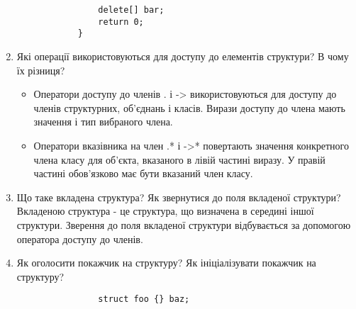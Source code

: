 \begin{enumerate}
\begin{verbatim}
                delete[] bar;
                return 0;
            }
    \end{verbatim}
    \item Які операції використовуються для доступу до елементів структури? В чому їх різниця?
          \begin{itemize}
              \item Оператори доступу до членів . і -> використовуються для доступу до
                    членів структурних, об'єднань і класів. Вирази доступу до
                    члена мають значення і тип вибраного члена.
              \item Оператори вказівника на член .* і ->* повертають значення конкретного
                    члена класу для об'єкта, вказаного в лівій частині виразу.
                    У правій частині обов'язково має бути вказаний член класу.
          \end{itemize}
    \item Що таке вкладена структура? Як звернутися до поля вкладеної структури? \\
          Вкладеною структура - це структура, що визначена в середині іншої структури.
          Зверення до поля вкладеної структури відбувається за допомогою оператора доступу до членів.
    \item Як оголосити покажчик на структуру? Як ініціалізувати покажчик на структуру?
          \begin{verbatim}
                struct foo {} baz;


\end{verbatim}
\end{enumerate}
